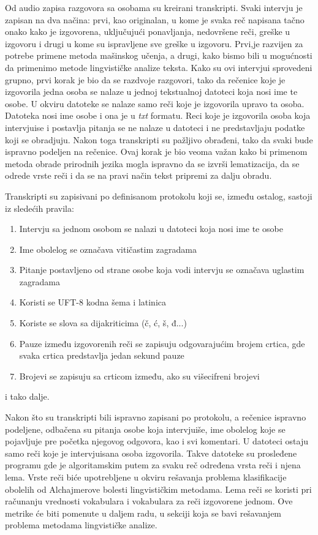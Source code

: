 \documentclass[12pt,oneside]{memoir}
\begin{document}
Od audio zapisa razgovora sa osobama su kreirani transkripti. Svaki intervju je zapisan na dva načina: prvi, kao originalan, u kome je svaka reč napisana tačno onako kako je izgovorena, uključujući ponavljanja, nedovršene reči, greške u izgovoru i drugi u kome su ispravljene sve greške u izgovoru. Prvi,je razvijen za potrebe primene metoda mašinskog učenja, a drugi, kako bismo bili u mogućnosti da primenimo metode lingvističke analize teksta. Kako su ovi intervjui sprovedeni grupno, prvi korak je bio da se razdvoje razgovori, tako da rečenice koje je izgovorila jedna osoba se nalaze u jednoj tekstualnoj datoteci koja nosi ime te osobe. U okviru datoteke se nalaze samo reči koje je izgovorila upravo ta osoba. Datoteka nosi ime osobe i ona je u \textit{txt} formatu.  Reci koje je izgovorila osoba koja intervjuise i postavlja pitanja se ne nalaze u datoteci i ne predstavljaju podatke koji se obradjuju. Nakon toga transkripti su pažljivo obrađeni, tako da svaki bude ispravno podeljen na rečenice. Ovaj korak je bio veoma važan kako bi primenom metoda obrade prirodnih jezika mogla ispravno da se izvrši lematizacija, da se odrede vrste reči i da se na pravi način tekst pripremi za dalju obradu.

Transkripti su zapisivani po definisanom protokolu koji se, između ostalog, sastoji iz sledećih pravila:

\begin{enumerate}
\item Intervju sa jednom osobom se nalazi u datoteci koja nosi ime te osobe
\item Ime obolelog se označava vitičastim zagradama
\item Pitanje postavljeno od strane osobe koja vodi intervju se označava uglastim zagradama
\item Koristi se UFT-8 kodna šema i latinica
\item Koriste se slova sa dijakriticima (č, ć, š, đ...)
\item Pauze između izgovorenih reči se zapisuju odgovarajućim brojem crtica, gde svaka crtica predstavlja jedan sekund pauze
\item Brojevi se zapisuju sa crticom između, ako su višecifreni brojevi
\end{enumerate}
i tako dalje.  

Nakon što su transkripti bili ispravno zapisani po protokolu, a rečenice ispravno podeljene, odbačena su pitanja osobe koja intervjuiše, ime obolelog koje se pojavljuje pre početka njegovog odgovora, kao i svi komentari. U datoteci ostaju samo reči koje je intervjuisana osoba izgovorila. Takve datoteke su prosleđene programu gde je algoritamskim putem za svaku reč određena vrsta reči i njena lema. Vrste reči biće upotrebljene u okviru rešavanja problema klasifikacije obolelih od Alchajmerove bolesti lingvističkim metodama. Lema reči se koristi pri računanju vrednosti vokabulara i vokabulara za reči izgovorene jednom. Ove metrike će biti pomenute u daljem radu, u sekciji koja se bavi rešavanjem problema metodama lingvističke analize.
\end{document}
